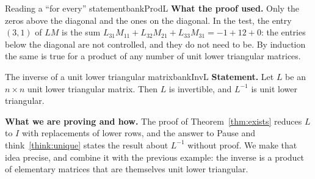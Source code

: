 \documentclass[11pt]{article}
\begin{document}
\begin{exmp}{Reading a ``for every'' statement}{bankProdL}
\textbf{What the proof used.} Only the zeros above the diagonal and the ones on the diagonal. In the test, the entry $(3,1)$ of $LM$ is the sum $L_{31}M_{11}+L_{32}M_{21}+L_{33}M_{31}=-1+12+0$: the entries below the diagonal are not controlled, and they do not need to be. By induction the same is true for a product of any number of unit lower triangular matrices.
\end{exmp}

\begin{exmp}{The inverse of a unit lower triangular matrix}{bankInvL}
\textbf{Statement.} Let $L$ be an $n\times n$ unit lower triangular matrix. Then $L$ is invertible, and $L^{-1}$ is unit lower triangular.

\textbf{What we are proving and how.} The proof of Theorem~\ref{thm:exists} reduces $L$ to $I$ with replacements of lower rows, and the answer to Pause and think~\ref{think:unique} states the result about $L^{-1}$ without proof. We make that idea precise, and combine it with the previous example: the inverse is a product of elementary matrices that are themselves unit lower triangular.


\end{exmp}
\end{document}
